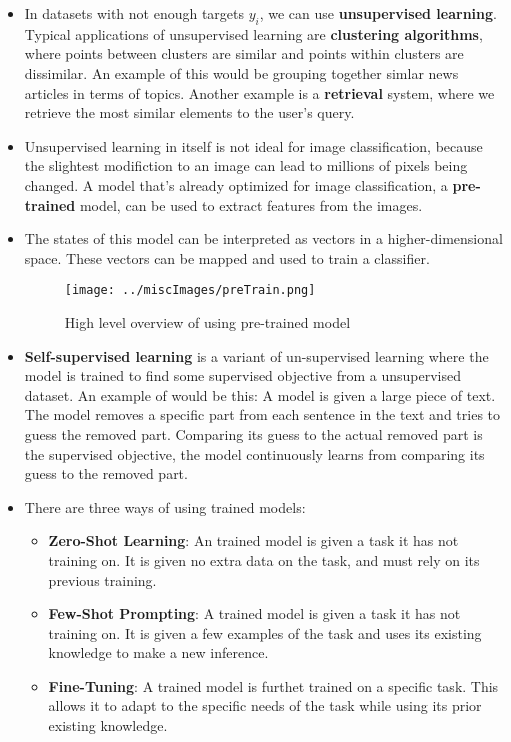 \documentclass{article}
\newcommand{\tbf}[1]{\textbf{#1}}
\begin{document}
\begin{itemize}
    \item In datasets with not enough targets $y_i$, we can use \tbf{unsupervised learning}. Typical applications of unsupervised learning are \tbf{clustering algorithms}, 
    where points between clusters are similar and points within clusters are dissimilar. An example of this would be grouping together simlar news articles in terms of topics. 
    Another example is a \tbf{retrieval} system, where we retrieve the most similar elements to the user's query.
    \item Unsupervised learning in itself is not ideal for image classification, because the slightest modifiction to an image can lead to millions of pixels being changed. 
    A model that's already optimized for image classification, a \tbf{pre-trained} model, can be used to extract features from the images.
    \item The states of this model can be interpreted as vectors in a higher-dimensional space. These vectors can be mapped and used to train a classifier.
    
    \begin{figure}[h]
        \centering
        \texttt{[image: ../miscImages/preTrain.png]} 
        \caption{High level overview of using pre-trained model}
        \label{fig:example}
    \end{figure}

    \item \tbf{Self-supervised learning} is a variant of un-supervised learning where the model is trained to find some supervised objective from a unsupervised dataset. 
    An example of would be this: A model is given a large piece of text. The model removes a specific part from each sentence in the text and tries to guess the removed part. 
    Comparing its guess to the actual removed part is the supervised objective, the model continuously learns from comparing its guess to the removed part.

    \item There are three ways of using trained models:
    
    \begin{itemize}
        \item \tbf{Zero-Shot Learning}: An trained model is given a task it has not training on. It is given no extra data on the task, and must rely on its previous training. 
        \item \tbf{Few-Shot Prompting}: A trained model is given a task it has not training on. It is given a few examples of the task and uses its existing knowledge to make a new inference.
        \item \tbf{Fine-Tuning}: A trained model is furthet trained on a specific task. This allows it to adapt to the specific needs of the task while using its prior existing knowledge.
    \end{itemize}


\end{itemize}
\end{document}
